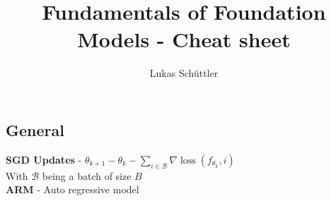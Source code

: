 

\title{Fundamentals of Foundation Models - Cheat sheet}
\author{Lukas Schüttler}
\pagestyle{empty}


\maketitle
\thispagestyle{empty}
\begin{multicols}{2}
    \section{General}
    \begin{mdframed}[style=eqbox]
        \textbf{SGD Updates} - $\theta_{k+1} - \theta_{k} - \sum_{i \in \mathcal{B}} \nabla \operatorname{loss}(f_{\theta_k}, i)$\\
        {\tiny With $\mathcal{B}$ being a batch of size $B$}\\
        \textbf{ARM} - Auto regressive model
    \end{mdframed}

\end{multicols}
